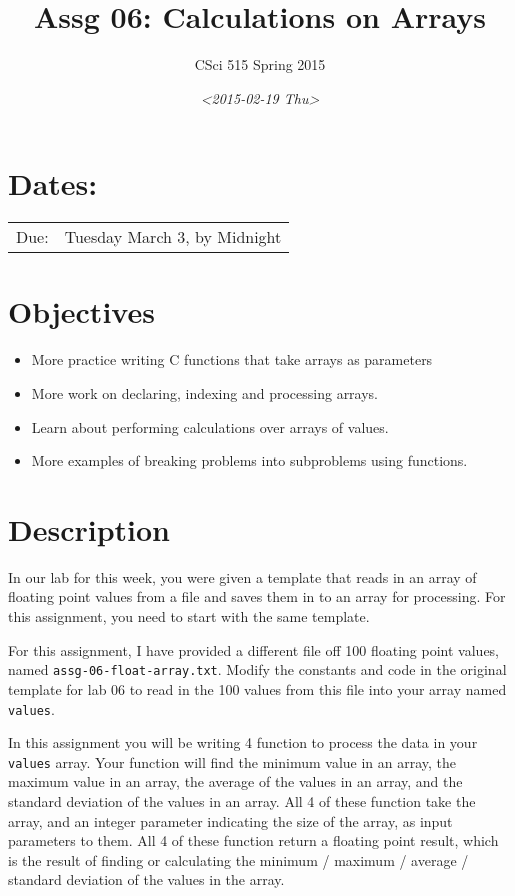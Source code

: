 \documentclass[11pt]{article}
\author{CSci 515 Spring 2015}
\date{\textit{<2015-02-19 Thu>}}
\title{Assg 06: Calculations on Arrays}
\begin{document}
\maketitle

\section*{Dates:}
\label{sec-1}
\begin{center}
\begin{tabular}{ll}
Due: & Tuesday March 3, by Midnight\\
\end{tabular}
\end{center}
\section*{Objectives}
\label{sec-2}
\begin{itemize}
\item More practice writing C functions that take arrays as parameters
\item More work on declaring, indexing and processing arrays.
\item Learn about performing calculations over arrays of values.
\item More examples of breaking problems into subproblems using functions.
\end{itemize}
\section*{Description}
\label{sec-3}
In our lab for this week, you were given a template that reads in an array
of floating point values from a file and saves them in to an array for processing.
For this assignment, you need to start with the same template.

For this assignment, I have provided a different file off 100 floating
point values, named \verb~assg-06-float-array.txt~.  Modify the constants and
code in the original template for lab 06 to read in the 100 values
from this file into your array named \verb~values~.

In this assignment you will be writing 4 function to process the data
in your \verb~values~ array.  Your function will find the minimum value in
an array, the maximum value in an array, the average of the values in
an array, and the standard deviation of the values in an array.  All 4
of these function take the array, and an integer parameter indicating
the size of the array, as input parameters to them.  All 4 of these
function return a floating point result, which is the result of
finding or calculating the minimum / maximum / average / standard
deviation of the values in the array.
\end{document}
